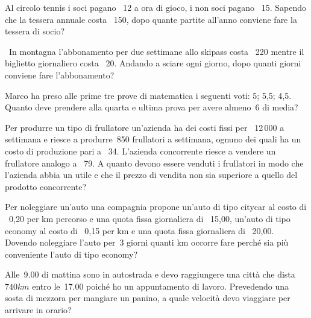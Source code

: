 \begin{multicols}{2}
 \begin{esercizio}
 \label{ese:21.22}
 Al circolo tennis i soci pagano \officialeuro\ 12 a ora di gioco, i non
soci pagano \officialeuro\ 15. Sapendo che la tessera annuale costa
\officialeuro\ 150, dopo quante partite all'anno conviene
fare la tessera di socio?
 \end{esercizio}

 \begin{esercizio}[\Ast]
 \label{ese:21.23}
 \ In montagna l'abbonamento per due settimane allo
skipass costa \officialeuro\ 220 mentre il biglietto giornaliero costa
\officialeuro\ 20. Andando a sciare ogni giorno, dopo quanti giorni
conviene fare l'abbonamento?
 \end{esercizio}

 \begin{esercizio}[\Ast]
 \label{ese:21.24}
 Marco ha preso alle prime tre prove di matematica i seguenti voti: 5;
5,5; 4,5. Quanto deve prendere alla quarta e ultima prova per avere almeno~6
di media?
 \end{esercizio}

 \begin{esercizio}
 \label{ese:21.25}
 Per produrre un tipo di frullatore un'azienda ha dei
costi fissi per \officialeuro\ 12\,000 a settimana e riesce a produrre~850
frullatori a settimana, ognuno dei quali ha un costo di produzione pari
a \officialeuro\ 34. L'azienda concorrente riesce a
vendere un frullatore analogo a \officialeuro\ 79. A quanto devono essere
venduti i frullatori in modo che l'azienda abbia un
utile e che il prezzo di vendita non sia superiore a quello del
prodotto concorrente?
 \end{esercizio}

 \begin{esercizio}[\Ast]
 \label{ese:21.26}
 Per noleggiare un'auto una compagnia propone
un'auto di tipo citycar al costo di \officialeuro\ 0,20 per km percorso e una quota fissa giornaliera
di \officialeuro\ 15,00,
un'auto di tipo economy al costo di \officialeuro\ 0,15
per km e una quota fissa giornaliera di \officialeuro\ 20,00. Dovendo
noleggiare l'auto per~3 giorni quanti km occorre fare
perché sia più conveniente l'auto di tipo economy?
 \end{esercizio}

 \begin{esercizio}
 \label{ese:21.27}
 Alle~9.00 di mattina sono in autostrada e devo raggiungere una città
che dista~\(740\unit{km}\) entro le~17.00 poiché ho un appuntamento di lavoro.
Prevedendo una sosta di mezzora per mangiare un panino, a quale
velocità devo viaggiare per arrivare in orario?
 \end{esercizio}


\end{multicols}
